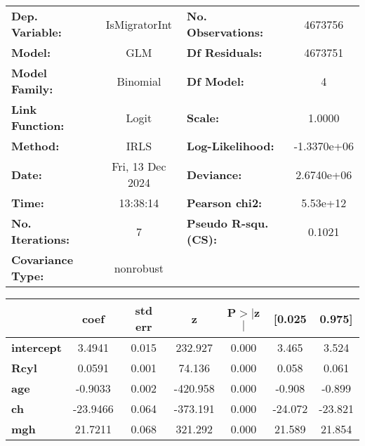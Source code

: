 \begin{center}
\begin{tabular}{lclc}
\toprule
\textbf{Dep. Variable:}   &  IsMigratorInt   & \textbf{  No. Observations:  } &   4673756    \\
\textbf{Model:}           &       GLM        & \textbf{  Df Residuals:      } &   4673751    \\
\textbf{Model Family:}    &     Binomial     & \textbf{  Df Model:          } &         4    \\
\textbf{Link Function:}   &      Logit       & \textbf{  Scale:             } &     1.0000   \\
\textbf{Method:}          &       IRLS       & \textbf{  Log-Likelihood:    } & -1.3370e+06  \\
\textbf{Date:}            & Fri, 13 Dec 2024 & \textbf{  Deviance:          } &  2.6740e+06  \\
\textbf{Time:}            &     13:38:14     & \textbf{  Pearson chi2:      } &   5.53e+12   \\
\textbf{No. Iterations:}  &        7         & \textbf{  Pseudo R-squ. (CS):} &    0.1021    \\
\textbf{Covariance Type:} &    nonrobust     & \textbf{                     } &              \\
\bottomrule
\end{tabular}
\begin{tabular}{lcccccc}
                   & \textbf{coef} & \textbf{std err} & \textbf{z} & \textbf{P$> |$z$|$} & \textbf{[0.025} & \textbf{0.975]}  \\
\midrule
\textbf{intercept} &       3.4941  &        0.015     &   232.927  &         0.000        &        3.465    &        3.524     \\
\textbf{Rcyl}      &       0.0591  &        0.001     &    74.136  &         0.000        &        0.058    &        0.061     \\
\textbf{age}       &      -0.9033  &        0.002     &  -420.958  &         0.000        &       -0.908    &       -0.899     \\
\textbf{ch}        &     -23.9466  &        0.064     &  -373.191  &         0.000        &      -24.072    &      -23.821     \\
\textbf{mgh}       &      21.7211  &        0.068     &   321.292  &         0.000        &       21.589    &       21.854     \\
\bottomrule
\end{tabular}
\end{center}